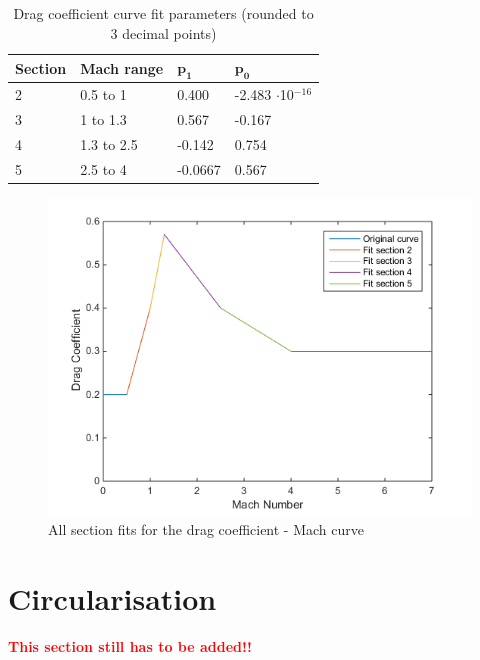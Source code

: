 \begin{table}[!ht]
\begin{center}
\caption{Drag coefficient curve fit parameters (rounded to 3 decimal points)}
\label{tab:dragCoeffPara}
\begin{tabular}{|l|l||l|l|}
\hline 
\textbf{Section}  & \textbf{Mach range}& $\mathbf{p_{1}}$ & $\mathbf{p_{0}}$ \\ \hline 
2  & 0.5 to 1  & 0.400 & -2.483 $\cdot$10$^{-16}$  \\ \hline
3  & 1 to 1.3  & 0.567 & -0.167  \\ \hline
4  &  1.3 to 2.5 & -0.142 & 0.754 \\ \hline
5  &  2.5 to 4 & -0.0667 & 0.567 \\ \hline
\end{tabular}
\end{center}
\end{table}



\begin{figure}[!ht]
\centering
\includegraphics[width=1.0\textwidth]{figures/software/dragCoeffFit.png}
\caption{All section fits for the drag coefficient - Mach curve}
\label{fig:dragCoeffFit}
\end{figure}

\section{Circularisation}
\label{sec:modelCircularisation}
\textbf{\textcolor{red}{This section still has to be added!!}}